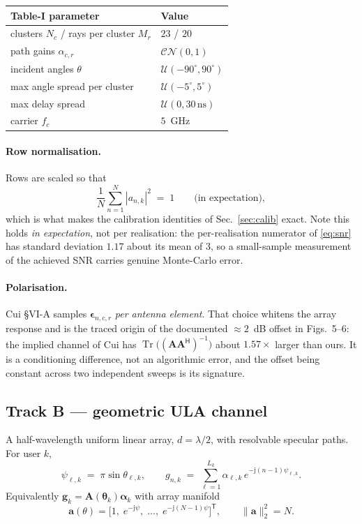 \documentclass[11pt,a4paper]{article}
\newcommand{\CN}{\mathcal{CN}}
\newcommand{\Unif}{\mathcal{U}}
\newcommand{\herm}{\mathsf{H}}
\newcommand{\trans}{\mathsf{T}}
\newcommand{\mat}[1]{\mathbf{#1}}
\newcommand{\vect}[1]{\mathbf{#1}}
\newcommand{\jj}{\mathrm{j}}
\newcommand{\Tr}{\operatorname{Tr}}
\begin{document}
\begin{table}[h]\centering
\begin{tabular}{@{}ll@{}}
\toprule
Table-I parameter & Value\\
\midrule
clusters $N_c$ / rays per cluster $M_r$ & $23$ / $20$\\
path gains $\alpha_{c,r}$ & $\CN(0,1)$\\
incident angles $\theta$ & $\Unif(-90^\circ,90^\circ)$\\
max angle spread per cluster & $\Unif(-5^\circ,5^\circ)$\\
max delay spread & $\Unif(0,30\,\mathrm{ns})$\\
carrier $f_c$ & $5$~GHz\\
\bottomrule
\end{tabular}
\end{table}

\paragraph{Row normalisation.} Rows are scaled so that
\begin{equation}
\frac{1}{N}\sum_{n=1}^{N}|a_{n,k}|^2 \;=\; 1
\qquad\text{(in expectation)},
\label{eq:rownorm}
\end{equation}
which is what makes the calibration identities of
Sec.~\ref{sec:calib} exact. Note this holds \emph{in expectation}, not per
realisation: the per-realisation numerator of \eqref{eq:snr} has standard
deviation $1.17$ about its mean of $3$, so a small-sample measurement of the
achieved SNR carries genuine Monte-Carlo error.

\paragraph{Polarisation.} Cui \S VI-A samples
$\boldsymbol{\epsilon}_{n,c,r}$ \emph{per antenna element}. That choice
whitens the array response and is the traced origin of the documented
$\approx 2$~dB offset in Figs.~5--6: the implied channel of Cui has
$\Tr\bigl((\mat{A}\mat{A}^{\herm})^{-1}\bigr)$ about $1.57\times$ larger than
ours. It is a conditioning difference, not an algorithmic error, and the
offset being constant across two independent sweeps is its signature.

\subsection{Track B --- geometric ULA channel}
A half-wavelength uniform linear array, $d=\lambda/2$, with resolvable
specular paths. For user $k$,
\begin{equation}
\psi_{\ell,k} \;=\; \pi\sin\theta_{\ell,k},
\qquad
g_{n,k} \;=\; \sum_{\ell=1}^{L_k}
  \alpha_{\ell,k}\, e^{-\jj (n-1)\psi_{\ell,k}} .
\label{eq:chB}
\end{equation}
Equivalently $\vect{g}_k = \mat{A}(\boldsymbol{\theta}_k)\boldsymbol{\alpha}_k$
with array manifold
\begin{equation}
\vect{a}(\theta) = \bigl[1,\;e^{-\jj\psi},\;\dots,\;e^{-\jj(N-1)\psi}\bigr]^{\trans},
\qquad \|\vect{a}\|_2^2 = N .
\label{eq:manifold}
\end{equation}
\end{document}
